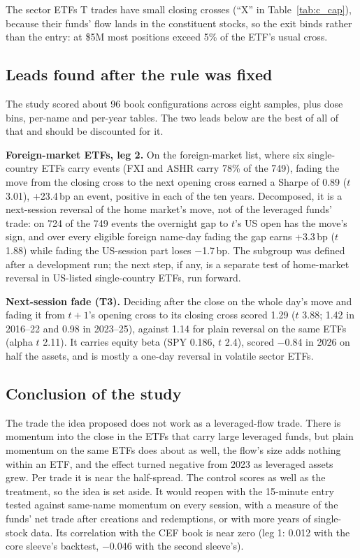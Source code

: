 \documentclass[10pt, a4paper, twocolumn]{article}
\begin{document}
The sector ETFs T trades have small closing crosses (``X'' in Table~\ref{tab:c_cap}), because their funds' flow lands in the constituent stocks, so the exit binds rather than the entry: at \$5M most positions exceed 5\% of the ETF's usual cross.

\subsection{Leads found after the rule was fixed}
\label{sec:c_leads}

The study scored about 96 book configurations across eight samples, plus dose bins, per-name and per-year tables. The two leads below are the best of all of that and should be discounted for it.

\textbf{Foreign-market ETFs, leg 2.} On the foreign-market list, where six single-country ETFs carry events (FXI and ASHR carry 78\% of the 749), fading the move from the closing cross to the next opening cross earned a Sharpe of 0.89 ($t$ 3.01), +23.4\,bp an event, positive in each of the ten years. Decomposed, it is a next-session reversal of the home market's move, not of the leveraged funds' trade: on 724 of the 749 events the overnight gap to $t$'s US open has the move's sign, and over every eligible foreign name-day fading the gap earns +3.3\,bp ($t$ 1.88) while fading the US-session part loses $-$1.7\,bp. The subgroup was defined after a development run; the next step, if any, is a separate test of home-market reversal in US-listed single-country ETFs, run forward.

\textbf{Next-session fade (T3).} Deciding after the close on the whole day's move and fading it from $t+1$'s opening cross to its closing cross scored 1.29 ($t$ 3.88; 1.42 in 2016--22 and 0.98 in 2023--25), against 1.14 for plain reversal on the same ETFs (alpha $t$ 2.11). It carries equity beta (SPY 0.186, $t$ 2.4), scored $-$0.84 in 2026 on half the assets, and is mostly a one-day reversal in volatile sector ETFs.

\subsection{Conclusion of the study}

The trade the idea proposed does not work as a leveraged-flow trade. There is momentum into the close in the ETFs that carry large leveraged funds, but plain momentum on the same ETFs does about as well, the flow's size adds nothing within an ETF, and the effect turned negative from 2023 as leveraged assets grew. Per trade it is near the half-spread. The control scores as well as the treatment, so the idea is set aside. It would reopen with the 15-minute entry tested against same-name momentum on every session, with a measure of the funds' net trade after creations and redemptions, or with more years of single-stock data. Its correlation with the CEF book is near zero (leg 1: 0.012 with the core sleeve's backtest, $-$0.046 with the second sleeve's).
\end{document}
